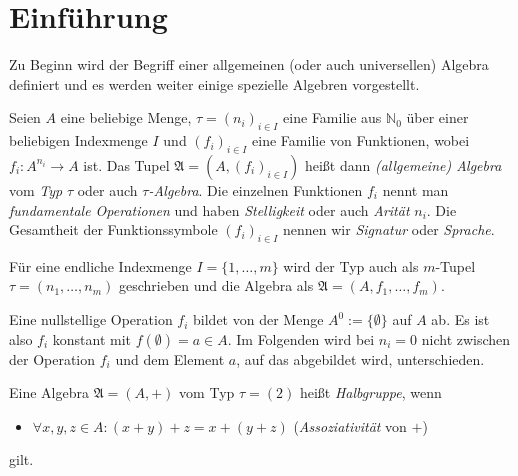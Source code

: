 \section{Einführung}

Zu Beginn wird der Begriff einer allgemeinen (oder auch universellen) Algebra definiert und es werden weiter einige spezielle Algebren vorgestellt.

\begin{definition}\label{def:algebra}\label{def:allg_algebra}
    Seien $A$ eine beliebige Menge, $\tau = (n_i)_{i \in I}$ eine Familie aus $\mathbb{N}_0$ über einer beliebigen Indexmenge $I$ und $(f_i)_{i \in I}$ eine Familie von Funktionen, wobei $f_i: A^{n_i} \to A$ ist. 
    Das Tupel $\mathfrak{A} = (A, (f_i)_{i \in I})$ heißt dann \emph{(allgemeine) Algebra} vom \emph{Typ} $\tau$ oder auch \emph{$\tau$-Algebra}. Die einzelnen Funktionen $f_i$ nennt man \emph{fundamentale Operationen} und haben \emph{Stelligkeit} oder auch \emph{Arität} $n_i$. Die Gesamtheit der Funktionssymbole $(f_i)_{i\in I}$ nennen wir \emph{Signatur} oder \emph{Sprache}.
\end{definition}

\begin{remark}
    Für eine endliche Indexmenge $I = \{1, \ldots, m\}$ wird der Typ auch als $m$-Tupel $\tau = (n_1, \ldots, n_m)$ geschrieben und die Algebra als $\mathfrak{A} = (A, f_1, \ldots, f_m)$.
\end{remark}

\begin{remark}
    Eine nullstellige Operation $f_i$ bildet von der Menge $A^0 := \{\emptyset\}$ auf $A$ ab. Es ist also $f_i$ konstant mit $f(\emptyset) = a \in A$. Im Folgenden wird bei $n_i = 0$ nicht zwischen der Operation $f_i$ und dem Element $a$, auf das abgebildet wird, unterschieden.
\end{remark}

\begin{definition}\label{def:halbgruppe}
    Eine Algebra $\mathfrak{A} = (A, +)$ vom Typ $\tau = (2)$ heißt \emph{Halbgruppe}, wenn 
    \begin{itemize}
        \item $\forall x,y,z \in A: (x + y) + z = x + (y + z)$ \tab (\emph{Assoziativität} von $+$)
    \end{itemize}
    gilt.
\end{definition}

